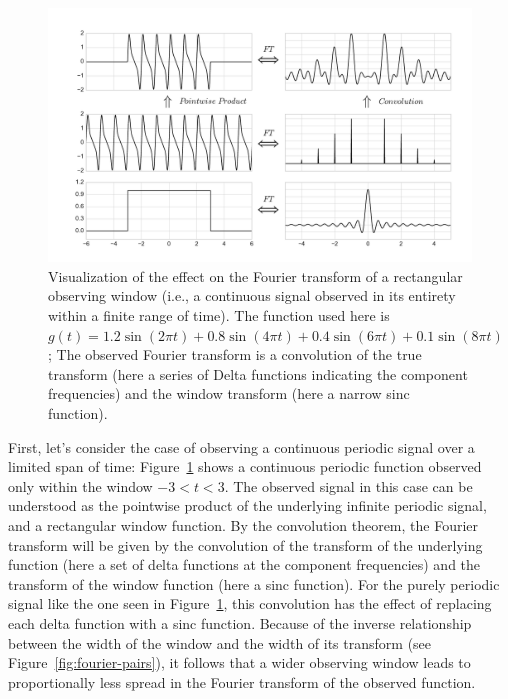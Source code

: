 \documentclass[preprint]{aastex}
\newcommand{\Fig}[1]{Figure~\ref{fig:#1}}
\newcommand{\fig}[1]{Figure~\ref{fig:#1}}
\newcommand{\figlabel}[1]{\label{fig:#1}}
\begin{document}
\begin{figure}[ht]
  \centering
  \includegraphics[width=\textwidth]{fig06_Rectangular_Window}
  \caption{Visualization of the effect on the Fourier transform of a
    rectangular observing window (i.e., a continuous signal observed in its
    entirety within a finite range of time). The function used here is
    $g(t) = 1.2\sin(2\pi t) + 0.8\sin(4\pi t) + 0.4\sin(6\pi t) + 0.1\sin(8\pi t)$; The observed Fourier
    transform is a convolution of the true transform (here a series of Delta
    functions indicating the component frequencies) and the window transform
    (here a narrow sinc function).
    \figlabel{rectangular-window}}
\end{figure}

First, let's consider the case of observing a continuous periodic signal over
a limited span of time: \fig{rectangular-window} shows
a continuous periodic function observed only within the window $-3<t<3$.
The observed signal in this case can be understood as the pointwise product of
the underlying infinite periodic signal, and a rectangular window function.
By the convolution theorem, the Fourier transform will be given by the
convolution of the transform of the underlying function (here a set of
delta functions at the component frequencies) and the transform of the window
function (here a sinc function).
For the purely periodic signal like the one seen in \fig{rectangular-window},
this convolution has the effect of replacing each delta function with a
sinc function.
Because of the inverse relationship between the width of the window and the
width of its transform (see \Fig{fourier-pairs}), it follows that a wider
observing window leads to proportionally less spread in the Fourier
transform of the observed function.
\end{document}
